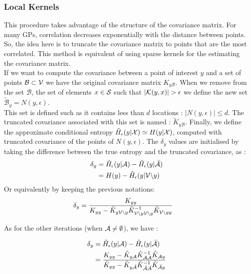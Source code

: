 \subsubsection{Local Kernels} This procedure takes advantage of the structure of the covariance matrix. For many GPs, correlation decreases exponentially with the distance between points. So, the idea here is to truncate the covariance matrix to points that are the most correlated. This method is equivalent of using sparse kernels for the estimating the covariance matrix. \\ 

If we want to compute the covariance between a point of interest $y$ and a set of points $\mathcal{B} \subset \V $ we have the original covariance matrix $K_{y\mathcal{B}}$. When we remove from the set $\mathcal{B}$, the set of elements  $x \in \S$ such that $|\K(y,x)| > \epsilon $ we define the new set  $\tilde{\mathcal{B}}_y = N(y,\epsilon)$. \\

This set is defined such as it contains less than $d$ locations : $|N(y,\epsilon)| \leq d $. The truncated covariance associated with this set is named : $\tilde{K}_{y\mathcal{B}}$. Finally, we define the approximate conditional entropy $\tilde{H}_\epsilon(y | \X) \simeq H(y | \X)$, computed with truncated covariance of the points of $N(y,\epsilon)$. The $\delta_y$ values are initialised by taking the difference between the true entropy and the truncated covariance, as :
\begin{align}
    \delta_y &= \tilde{H}_\epsilon(y | \A) - \tilde{H}_\epsilon(y | \bar{\A}) \\
            &= H(y) - \tilde{H}_\epsilon(y | \V \backslash y )
\end{align}
Or equivalently by keeping the previous notations: 
\begin{align}
    \delta_y &= \frac{K_{yy} }{K_{yy} - \tilde{K}_{y\V \backslash y} \tilde{K}_{\V \backslash y \V \backslash y}^{-1} \tilde{K}_{\V \backslash y y} } \label{equ:initLocal}
\end{align}


As for the other iterations (when $\A \neq \emptyset$), we have : 

\begin{align}
    \delta_y &= \tilde{H}_\epsilon(y | \A) - \tilde{H}_\epsilon(y | \bar{\A}) \\
    &= \frac{K_{yy} - \tilde{K}_{y\A} \tilde{K}_{\A\A}^{-1} \tilde{K}_{\A y} }{\tilde{K}_{yy} - \tilde{K}_{y\bar{\A}} \tilde{K}_{\bar{\A}\bar{\A}}^{-1} \tilde{K}_{\bar{\A} y} } \label{equ:updateLocal}
\end{align}


